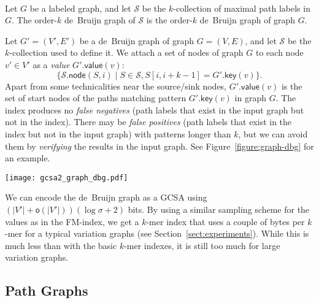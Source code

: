 \documentclass[twoside,leqno,twocolumn]{article}
\newcommand{\set}[1]{\ensuremath{\{ #1 \}}}
\newcommand{\abs}[1]{\ensuremath{\lvert #1 \rvert}}
\newcommand{\oh}[1]{\ensuremath{\mathsf{o}\!\left( #1 \right)}}
\newcommand{\glabel}{\ensuremath{\mathsf{label}}}
\newcommand{\gkey}{\ensuremath{\mathsf{key}}}
\newcommand{\gvalue}{\ensuremath{\mathsf{value}}}
\newcommand{\gnode}{\ensuremath{\mathsf{node}}}
\newcommand{\kmer}[1]{$#1$\nobreakdash-mer}
\newcommand{\kcollection}[1]{$#1$\nobreakdash-collection}
\newcommand{\orderk}[1]{order\nobreakdash-$#1$}
\begin{document}
\begin{Definition}\label{def:dbg} ~\\
Let $G$ be a labeled graph, and let $\mathcal{S}$ be the \kcollection{k} of maximal path labels in $G$. The \orderk{k} de~Bruijn graph of $\mathcal{S}$ is the \orderk{k} de~Bruijn graph of graph $G$.
\end{Definition}

Let $G' = (V', E')$ be a de~Bruijn graph of graph $G = (V, E)$, and let $\mathcal{S}$ be the \kcollection{k} used to define it. We attach a set of nodes of graph $G$ to each node $v' \in V'$ as a \emph{value} $G'.\gvalue(v)$:
$$
\set{ \mathcal{S}.\gnode(S, i) \mid S \in \mathcal{S}, S[i, i+k-1] = G'.\gkey(v)}.
$$
Apart from some technicalities near the source/sink nodes, $G'.\gvalue(v)$ is the set of start nodes of the paths matching pattern $G'.\gkey(v)$ in graph $G$. The index produces no \emph{false negatives} (path labels that exist in the input graph but not in the index). There may be \emph{false positives} (path labels that exist in the index but not in the input graph) with patterns longer than $k$, but we can avoid them by \emph{verifying} the results in the input graph. See Figure~\ref{figure:graph-dbg} for an example.

\begin{figure*}[t!]
\texttt{[image: gcsa2\_graph\_dbg.pdf]}
\caption{Left: Input graph $G = (V, E)$, with each node $v \in V$ labeled with $v:G.\glabel(v)$. Right: The \protect\orderk{3} de~Bruijn graph $G' = (V', E')$ of graph $G$, with each node $v' \in V'$ labeled with $G'.\gkey(v')$ and $G'.\gvalue(v')$. Both: Edges $(t, s)$ are not shown. The highlighted path in the de~Bruijn graph is a false positive, as it consists of two disjoint paths in the input graph.}\label{figure:graph-dbg}
\end{figure*}

We can encode the de~Bruijn graph as a GCSA using $(\abs{V'} + \oh{\abs{V'}})(\log \sigma + 2)$ bits. By using a similar sampling scheme for the values as in the FM-index, we get a \kmer{k} index that uses a couple of bytes per \kmer{k} for a typical variation graphs (see Section~\ref{sect:experiments}). While this is much less than with the basic \kmer{k} indexes, it is still too much for large variation graphs.

\subsection{Path Graphs}
\end{document}
